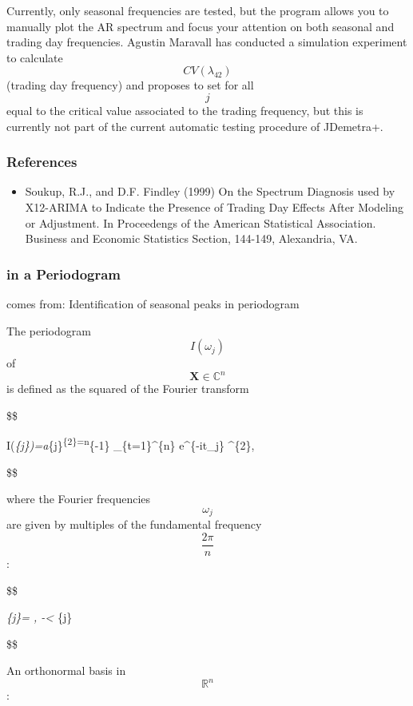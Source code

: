 \documentclass[
  letterpaper,
  DIV=11,
  numbers=noendperiod]{scrreprt}
\providecommand{\tightlist}{%
  \setlength{\itemsep}{0pt}\setlength{\parskip}{0pt}}\usepackage{longtable,booktabs,array}
\begin{document}
Currently, only seasonal frequencies are tested, but the program allows
you to manually plot the AR spectrum and focus your attention on both
seasonal and trading day frequencies. Agustin Maravall has conducted a
simulation experiment to calculate \[ CV(\lambda_{42}) \] (trading day
frequency) and proposes to set for all \[j\] equal to the critical value
associated to the trading frequency, but this is currently not part of
the current automatic testing procedure of JDemetra+.

\hypertarget{references-2}{%
\subsubsection{References}\label{references-2}}

\begin{itemize}
\tightlist
\item
  Soukup, R.J., and D.F. Findley (1999) On the Spectrum Diagnosis used
  by X12-ARIMA to Indicate the Presence of Trading Day Effects After
  Modeling or Adjustment. In Proceedengs of the American Statistical
  Association. Business and Economic Statistics Section, 144-149,
  Alexandria, VA.
\end{itemize}

\hypertarget{in-a-periodogram}{%
\subsubsection{in a Periodogram}\label{in-a-periodogram}}

comes from: Identification of seasonal peaks in periodogram

The periodogram \[ I(\omega_j)\] of \[ \mathbf{X} \in \mathbb{C}^n \] is
defined as the squared of the Fourier transform

\$\$

I(\omega\emph{\{j\})=a}\{j\}\textsuperscript{\{2\}=n}\{-1\}\left\textbar{}
\sum\_\{t=1\}\^{}\{n\} e\^{}\{-it\omega\_j\}
\right\textbar\^{}\{2\},

\$\$

where the Fourier frequencies \[ \omega_{j} \] are given by multiples of
the fundamental frequency \[ \frac{2\pi}{n} \]:

\$\$

\omega\emph{\{j\}= , -\pi \textless{} \omega}\{j\}
\leq \pi 

\$\$

An orthonormal basis in \[ \mathbb{R}^n \]:
\end{document}
